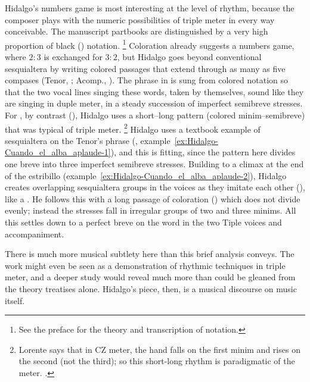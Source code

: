%
Hidalgo's numbers game is most interesting at the level of rhythm, because the composer plays with the numeric possibilities of triple meter in every way conceivable.
The manuscript partbooks are distinguished by a very high proportion of black () notation.%
	\footnote{%
	See the preface for the theory and transcription of  notation.
	}
Coloration already suggests a numbers game, where $2:3$ is exchanged for $3:2$, but Hidalgo goes beyond conventional sesquialtera by writing colored passages that extend through as many as five compases (Tenor, ; Acomp., ).
The phrase  in  is sung from colored notation so that the two vocal lines singing these words, taken by themselves, sound like they are singing in duple meter, in a steady succession of imperfect semibreve stresses.
For , by contrast (), Hidalgo uses a short--long pattern (colored minim--semibreve) that was typical of triple meter.%
	\footnote{%
	Lorente says that in CZ meter, the hand falls on the first minim and rises on the second (not the third); so this short-long rhythm is paradigmatic of the meter. .
	}
Hidalgo uses a textbook example of sesquialtera on the Tenor's phrase   (, example~\ref{ex:Hidalgo-Cuando_el_alba_aplaude-1}), and this is fitting, since the pattern here divides one breve into three imperfect semibreve stresses.
Building to a climax at the end of the estribillo (example~\ref{ex:Hidalgo-Cuando_el_alba_aplaude-2}), Hidalgo creates overlapping sesquialtera groups in the voices as they imitate each other (), like a .
He follows this with a long passage of coloration () which does not divide evenly; instead the stresses fall in irregular groups of two and three minims.
All this settles down to a perfect breve on the word  in the two Tiple voices and accompaniment.

%
There is much more musical subtlety here than this brief analysis conveys.
The work might even be seen as a demonstration of rhythmic techniques in triple meter, and a deeper study would reveal much more than could be gleaned from the theory treatises alone.
Hidalgo's piece, then, is a musical discourse on music itself.

